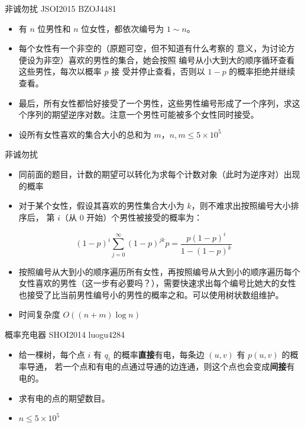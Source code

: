 \documentclass{beamer}
\begin{document}
    \begin{frame}{非诚勿扰}
        {JSOI2015 BZOJ4481}
        \begin{itemize}
            \setlength{\itemsep}{10pt}
            \item 有 $n$ 位男性和 $n$ 位女性，都依次编号为 $1\sim n$。
            \item 每个女性有一个非空的（原题可空，但不知道有什么考察的
            意义，为讨论方便设为非空）喜欢的男性的集合，她会按照
            编号从小大到大的顺序循环查看这些男性，每次以概率 $p$ 接
            受并停止查看，否则以 $1-p$ 的概率拒绝并继续查看。
            \item 最后，所有女性都恰好接受了一个男性，这些男性编号形成了一个序列，求这个序列的期望逆序对数。注意一个男性可能被多个女性同时接受。
            \item 设所有女性喜欢的集合大小的总和为 $m$，$n,m \le 5\times 10^5$
        \end{itemize}
    \end{frame}

    \begin{frame}{非诚勿扰}
        \begin{itemize}
            \setlength{\itemsep}{10pt}
            \item 同前面的题目，计数的期望可以转化为求每个计数对象（此时为逆序对）出现的概率
            \item 对于某个女性，假设其喜欢的男性集合大小为 $k$，则不难求出按照编号大小排序后，
            第 $i$（从 0 开始）个男性被接受的概率为：
        \end{itemize}
        \begin{equation*}
            (1-p)^i \sum_{j=0}^{\infty} (1-p)^{jk}p = \frac{p(1-p)^i}{1-(1-p)^k}
        \end{equation*}
        \begin{itemize}
            \setlength{\itemsep}{10pt}
            \item 按照编号从大到小的顺序遍历所有女性，再按照编号从大到小的顺序遍历每个女性喜欢的男性（这一步有必要吗？），需要快速求出每个编号比她大的女性
            也接受了比当前男性编号小的男性的概率之和。可以使用树状数组维护。
            \item 时间复杂度 $O\left((n+m)\log n\right)$
        \end{itemize}
    \end{frame}

    \begin{frame}{概率充电器}
        {SHOI2014 luogu4284}
        \begin{itemize}
            \setlength{\itemsep}{10pt}
            \item 给一棵树，每个点 $i$ 有 $q_i$ 的概率\textbf{直接}有电，每条边 $(u,v)$ 有 $p(u, v)$ 的概率导通，
            若一个点和有电的点通过导通的边连通，则这个点也会变成\textbf{间接}有电的。
            \item 求有电的点的期望数目。
            \item $n\le 5\times 10^5$
        \end{itemize}
    \end{frame}
\end{document}
